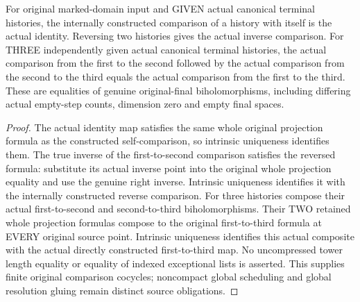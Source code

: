 \begin{theorem}
\label{hir:original-ambient-terminal-comparison-identity-inverse-cocycle}
\leanok
For original marked-domain input and GIVEN actual canonical terminal
histories, the internally constructed comparison of a history with itself
is the actual identity. Reversing two histories gives the actual inverse
comparison. For THREE independently given actual canonical terminal
histories, the actual comparison from the first to the second followed
by the actual comparison from the second to the third equals the actual
comparison from the first to the third. These are equalities of genuine
original-final biholomorphisms, including differing actual empty-step
counts, dimension zero and empty final spaces.
\end{theorem}
\begin{proof}
The actual identity map satisfies the same whole original projection
formula as the constructed self-comparison, so intrinsic uniqueness
identifies them. The true inverse of the first-to-second comparison
satisfies the reversed formula: substitute its actual inverse point into
the original whole projection equality and use the genuine right inverse.
Intrinsic uniqueness identifies it with the internally constructed
reverse comparison. For three histories compose their actual first-to-second
and second-to-third biholomorphisms. Their TWO retained whole projection
formulas compose to the original first-to-third formula at EVERY original
source point. Intrinsic uniqueness identifies this actual composite with
the actual directly constructed first-to-third map. No uncompressed tower
length equality or equality of indexed exceptional lists is asserted.
This supplies finite original comparison cocycles; noncompact global
scheduling and global resolution gluing remain distinct source obligations.
\end{proof}
